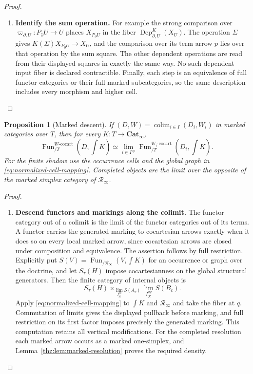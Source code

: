 \documentclass[oneside]{article}
\theoremstyle{plain}
\newtheorem{proposition}[theorem]{Proposition}
\theoremstyle{definition}
\theoremstyle{remark}
\newcommand{\Cat}{\mathbf{Cat}_{\infty}}
\newcommand{\Dep}{\operatorname{Dep}}
\newcommand{\Fun}{\operatorname{Fun}}
\newcommand{\RNU}{\mathcal R_{\infty}}
\newcommand{\coc}{\mathrm{cocart}}
\newcommand{\op}{\mathrm{op}}
\begin{document}
\begin{proof}
\begin{enumerate}
and comparison squares. Proposition~\ref{prop:polynomial-arity} identifies
their complete Segal fibers with evaluation at comprehension contexts.
The polynomial mates and the comparison cubes are those already
constructed, so pasting introduces no additional preservation fields.
\item \textbf{Identify the sum operation.} For example the strong comparison over
$\varpi_{\partial,U}:P_\partial U\to U$ places $X_{P_\partial U}$
in the fiber $\Dep^K_{\partial,U}(X_U)$. The operation $\Sigma$ gives
$K(\Sigma)X_{P_\partial U}\to X_U$, and the comparison over its term
arrow $p$ lies over that operation by the sum square. The other dependent
operations are read from their displayed squares in exactly the same way.
No such dependent input fiber is declared contractible. Finally, each
step is an equivalence of full functor categories or their full marked
subcategories, so the same description includes every morphism and higher
cell.\qedhere
\end{enumerate}
\end{proof}

\begin{proposition}[Marked descent]\label{prop:marked-descent}
If $(D,W)=\operatorname*{colim}_{i\in I}(D_i,W_i)$ in marked categories over
$T$, then for every $K:T\to\Cat$,
\[
 \Fun^{W\text{-}\coc}_{/T}(D,\textstyle\int K)
 \simeq\lim_{i\in I^{\op}}\Fun^{W_i\text{-}\coc}_{/T}(D_i,\textstyle\int K).
\]
For the finite shadow use the occurrence cells and the global graph
in \eqref{eq:normalized-cell-mapping}. Completed objects are the
limit over the opposite of the marked simplex category of $\RNU$.
\end{proposition}
\begin{proof}
\leavevmode
\begin{enumerate}
\item \textbf{Descend functors and markings along the colimit.} The functor category out of a colimit is the limit of the functor
categories out of its terms. A functor carries the generated marking to
cocartesian arrows exactly when it does so on every local marked arrow,
since cocartesian arrows are closed under composition and equivalence.
The assertion follows by full restriction. Explicitly put
$S(V)=\Fun_{/\RNU}(V,\int K)$ for an occurrence or graph over the
doctrine, and let $S_\tau(H)$ impose cocartesianness on the global
structural generators. Then the finite category of internal objects is
\[
 S_\tau(H)\times_{\lim_{I_{\mathcal R}^{\op}} S(A_c)}
                     \lim_{I_{\mathcal R}^{\op}} S(B_c).
\]
Apply \eqref{eq:normalized-cell-mapping} to $\int K$ and $\RNU$
and take the fiber at $q$. Commutation of limits gives the displayed
pullback before marking, and full restriction on its first factor
imposes precisely the generated marking. This computation retains
all vertical modifications. For the completed resolution each marked
arrow occurs as a marked one-simplex, and
Lemma~\ref{thz:lem:marked-resolution} proves the required density.\qedhere
\end{enumerate}
\end{proof}
\end{document}
